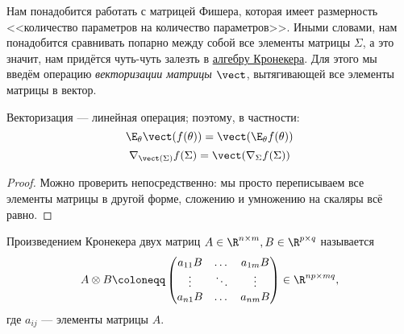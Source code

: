 Нам понадобится работать с матрицей Фишера, которая имеет размерность <<количество параметров на количество параметров>>. Иными словами, нам понадобится сравнивать попарно между собой все элементы матрицы $\Sigma$, а это значит, нам придётся чуть-чуть залезть в \href{https://ru.wikipedia.org/wiki/\%D0\%9F\%D1\%80\%D0\%BE\%D0\%B8\%D0\%B7\%D0\%B2\%D0\%B5\%D0\%B4\%D0\%B5\%D0\%BD\%D0\%B8\%D0\%B5_\%D0\%9A\%D1\%80\%D0\%BE\%D0\%BD\%D0\%B5\%D0\%BA\%D0\%B5\%D1\%80\%D0\%B0}{алгебру Кронекера}. Для этого мы введём операцию \emph{векторизации матрицы} $\vect$, вытягивающей все элементы матрицы в вектор. 

\begin{proposition}
Векторизация --- линейная операция; поэтому, в частности:
\begin{equation}\label{exp_in_vec}
    \E_\theta \vect (f(\theta)) = \vect(\E_\theta f(\theta))
\end{equation}
\begin{equation}\label{nab_in_vec}
    \nabla_{\vect(\Sigma)} f(\Sigma) = \vect(\nabla_\Sigma f(\Sigma))
\end{equation}
\begin{proof}
Можно проверить непосредственно: мы просто переписываем все элементы матрицы в другой форме, сложению и умножению на скаляры всё равно.
\end{proof}
\end{proposition}

\begin{definition}
Произведением Кронекера двух матриц $A \in \R^{n \times m}, B \in \R^{p \times q}$ называется
$$A \otimes B \coloneqq 
\begin{pmatrix}
a_{11}B & \dots & a_{1m}B \\
\vdots & \ddots & \vdots \\
a_{n1}B & \dots & a_{nm}B
\end{pmatrix}
\in \R^{np \times mq},$$
где $a_{ij}$ --- элементы матрицы $A$.
\end{definition}

